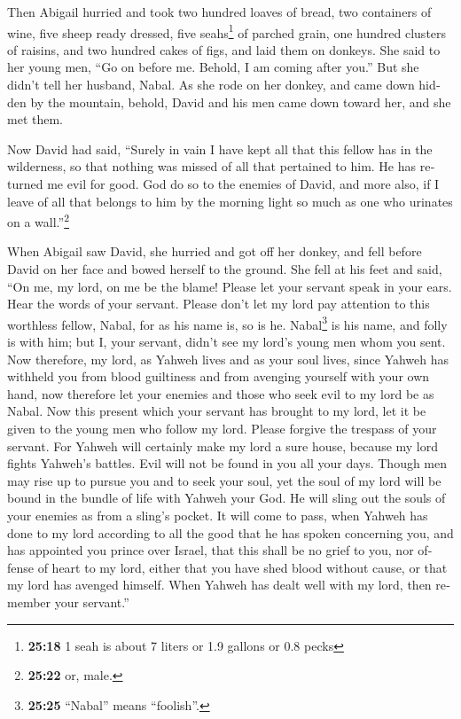 \begin{paracol}{2}
\begin{otherlanguage}{english}
 Then Abigail hurried and took two hundred loaves of
bread, two containers of wine, five sheep ready dressed, five
seahs\footnote{\textbf{25:18} 1 seah is about 7 liters or 1.9 gallons or
  0.8 pecks} of parched grain, one hundred clusters of raisins, and two
hundred cakes of figs, and laid them on donkeys.  She
said to her young men, ``Go on before me. Behold, I am coming after
you.'' But she didn't tell her husband, Nabal.  As she
rode on her donkey, and came down hidden by the mountain, behold, David
and his men came down toward her, and she met them.

 Now David had said, ``Surely in vain I have kept all
that this fellow has in the wilderness, so that nothing was missed of
all that pertained to him. He has returned me evil for good.
 God do so to the enemies of David, and more also, if I
leave of all that belongs to him by the morning light so much as one who
urinates on a wall.''\footnote{\textbf{25:22} or, male.}

 When Abigail saw David, she hurried and got off her
donkey, and fell before David on her face and bowed herself to the
ground.  She fell at his feet and said, ``On me, my lord,
on me be the blame! Please let your servant speak in your ears. Hear the
words of your servant.  Please don't let my lord pay
attention to this worthless fellow, Nabal, for as his name is, so is he.
Nabal\footnote{\textbf{25:25} ``Nabal'' means ``foolish''.} is his name,
and folly is with him; but I, your servant, didn't see my lord's young
men whom you sent.  Now therefore, my lord, as Yahweh
lives and as your soul lives, since Yahweh has withheld you from blood
guiltiness and from avenging yourself with your own hand, now therefore
let your enemies and those who seek evil to my lord be as Nabal.
 Now this present which your servant has brought to my
lord, let it be given to the young men who follow my lord.
 Please forgive the trespass of your servant. For Yahweh
will certainly make my lord a sure house, because my lord fights
Yahweh's battles. Evil will not be found in you all your days.
 Though men may rise up to pursue you and to seek your
soul, yet the soul of my lord will be bound in the bundle of life with
Yahweh your God. He will sling out the souls of your enemies as from a
sling's pocket.  It will come to pass, when Yahweh has
done to my lord according to all the good that he has spoken concerning
you, and has appointed you prince over Israel,  that this
shall be no grief to you, nor offense of heart to my lord, either that
you have shed blood without cause, or that my lord has avenged himself.
When Yahweh has dealt well with my lord, then remember your servant.''


\end{otherlanguage}
\end{paracol}
